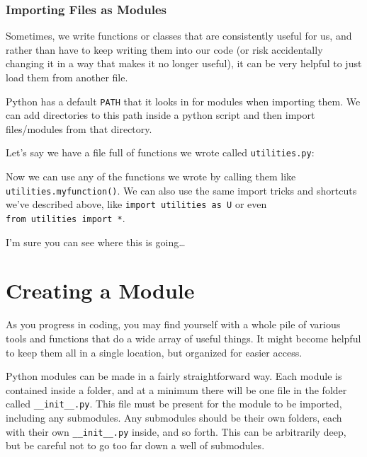 \hypertarget{importing-files-as-modules}{%
\subsubsection{Importing Files as
Modules}\label{importing-files-as-modules}}

Sometimes, we write functions or classes that are consistently useful
for us, and rather than have to keep writing them into our code (or risk
accidentally changing it in a way that makes it no longer useful), it
can be very helpful to just load them from another file.

Python has a default \texttt{PATH} that it looks in for modules when
importing them. We can add directories to this path inside a python
script and then import files/modules from that directory.

Let's say we have a file full of functions we wrote called
\texttt{utilities.py}:

\begin{Shaded}
\begin{Highlighting}[]
\NormalTok{)}
\end{Highlighting}
\end{Shaded}

Now we can use any of the functions we wrote by calling them like
\texttt{utilities.myfunction()}. We can also use the same import tricks
and shortcuts we've described above, like
\texttt{import\ utilities\ as\ U} or even
\texttt{from\ utilities\ import\ *}.

I'm sure you can see where this is going\ldots{}
\section{Creating a Module}
As you progress in coding, you may find yourself with a whole pile of
various tools and functions that do a wide array of useful things. It
might become helpful to keep them all in a single location, but
organized for easier access.

Python modules can be made in a fairly straightforward way. Each module
is contained inside a folder, and at a minimum there will be one file in
the folder called \texttt{\_\_init\_\_.py}. This file must be present
for the module to be imported, including any submodules. Any submodules
should be their own folders, each with their own
\texttt{\_\_init\_\_.py} inside, and so forth. This can be arbitrarily
deep, but be careful not to go too far down a well of submodules.

